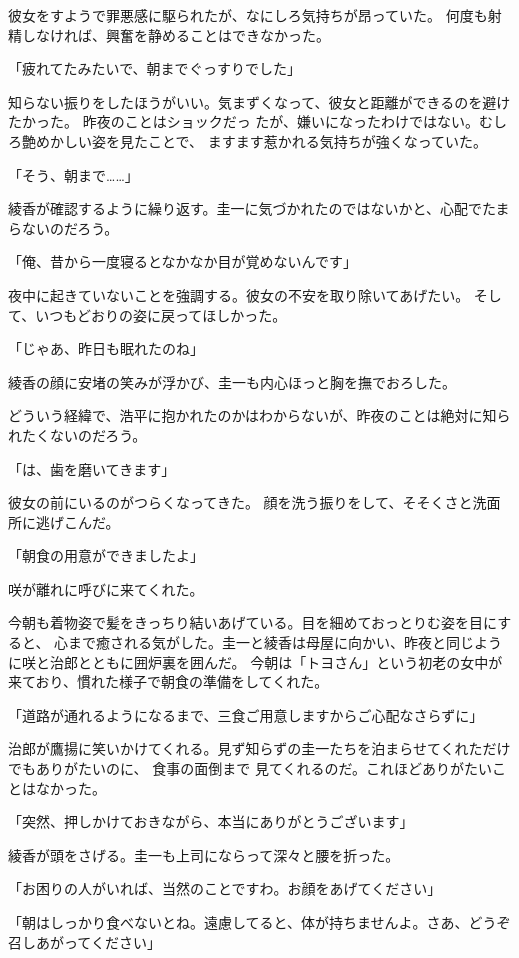 ﻿\documentclass[
    book,tate,
    line_length=30zw,
    jafontsize=12pt,
    paper=b5j,
    landscape,
    ]{jlreq}
\begin{document}
彼女をすようで罪悪感に駆られたが、なにしろ気持ちが昂っていた。
何度も射精しなければ、興奮を静めることはできなかった。

「疲れてたみたいで、朝までぐっすりでした」

知らない振りをしたほうがいい。気まずくなって、彼女と距離ができるのを避けたかった。
昨夜のことはショックだっ たが、嫌いになったわけではない。むしろ艶めかしい姿を見たことで、
ますます惹かれる気持ちが強くなっていた。

「そう、朝まで……」

綾香が確認するように繰り返す。圭一に気づかれたのではないかと、心配でたまらないのだろう。

「俺、昔から一度寝るとなかなか目が覚めないんです」

夜中に起きていないことを強調する。彼女の不安を取り除いてあげたい。
そして、いつもどおりの姿に戻ってほしかった。

「じゃあ、昨日も眠れたのね」

綾香の顔に安堵の笑みが浮かび、圭一も内心ほっと胸を撫でおろした。

どういう経緯で、浩平に抱かれたのかはわからないが、昨夜のことは絶対に知られたくないのだろう。

「は、歯を磨いてきます」

彼女の前にいるのがつらくなってきた。 顔を洗う振りをして、そそくさと洗面所に逃げこんだ。

「朝食の用意ができましたよ」

咲が離れに呼びに来てくれた。

今朝も着物姿で髪をきっちり結いあげている。目を細めておっとりむ姿を目にすると、
心まで癒される気がした。圭一と綾香は母屋に向かい、昨夜と同じように咲と治郎とともに囲炉裏を囲んだ。
今朝は「トヨさん」という初老の女中が来ており、慣れた様子で朝食の準備をしてくれた。

「道路が通れるようになるまで、三食ご用意しますからご心配なさらずに」

治郎が鷹揚に笑いかけてくれる。見ず知らずの圭一たちを泊まらせてくれただけでもありがたいのに、
食事の面倒まで 見てくれるのだ。これほどありがたいことはなかった。

「突然、押しかけておきながら、本当にありがとうございます」

綾香が頭をさげる。圭一も上司にならって深々と腰を折った。

「お困りの人がいれば、当然のことですわ。お顔をあげてください」

「朝はしっかり食べないとね。遠慮してると、体が持ちませんよ。さあ、どうぞ召しあがってください」
\end{document}
